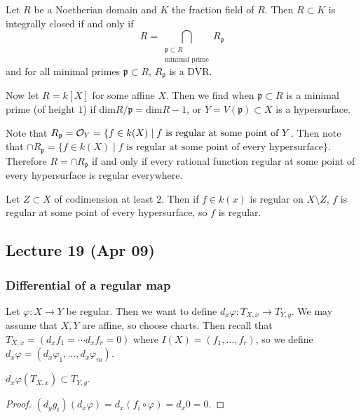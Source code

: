\documentclass[twoside, 10pt]{article}
\begin{document}
    \begin{thm} Let $R$ be a Noetherian domain and $K$ the
        fraction field of $R$. Then $R \subset K$ is integrally closed if and
        only if \[R = \bigcap_{\substack{\mathfrak{p} \subset R \\
        \text{minimal prime}}} R_{\mathfrak{p}}\] and for all minimal primes
        $\mathfrak{p} \subset R$, $R_{\mathfrak{p}}$ is a DVR.  \end{thm}

    Now let $R=k[X]$ for some affine $X$. Then we find when $\mathfrak{p}
    \subset R$ is a minimal prime (of height $1$) if $\mathrm{dim}
    R/\mathfrak{p} = \mathrm{dim} R - 1$, or $Y = V(\mathfrak{p}) \subset X$ is
    a hypersurface.

    Note that $R_{\mathfrak{p}} = \mathcal{O}_Y = \{ f \in k(X) \mid f \text{ is
        regular at some point of } Y$.  Then note that $\cap R_{\mathfrak{p}} =
        \{f \in k(X) \mid f \text{ is regular at some point of every
        hypersurface}\}$. Therefore $R = \cap R_{\mathfrak{p}}$ if and only if
        every rational function regular at some point of every hypersurface is
        regular everywhere.

        \begin{thm} Let $Z \subset X$ of
        codimension at least $2$. Then if $f \in k(x)$ is regular on $X
    \setminus Z$, $f$ is regular at some point of every hypersurface, so $f$ is
regular.  \end{thm}

        \subsection{Lecture 19 (Apr 09)} \subsubsection{Differential of a
        regular map} Let $\varphi:X \to Y$ be regular. Then we want to define
        $d_x \varphi: T_{X,x} \to T_{Y,y}$. We may assume that $X,Y$ are
        affine, so choose charts. Then recall that $T_{X,x} = (d_xf_1 = \cdots
        d_xf_r = 0)$ where $I(X) = (f_1, \ldots, f_r)$, so we define $d_x
        \varphi = (d_x \varphi_1, \ldots, d_x\varphi_m)$. 

        \begin{prop} $d_x \varphi(T_{X,x}) \subset T_{Y,y}$.  \begin{proof}
        $(d_yg_i)(d_x \varphi) = d_x (f_i \circ \varphi) = d_x 0 = 0$.
    \end{proof} \end{prop}
\end{document}
